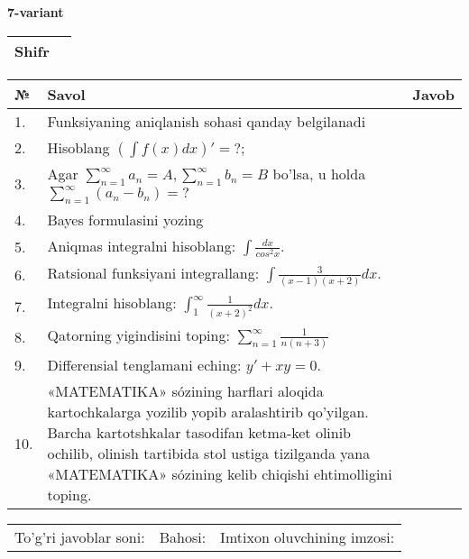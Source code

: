 \documentclass{article}
\begin{document}
  \egroup
  
  \newpage
  
  
  \textbf{7-variant}\\
  
  \bgroup
  \def\arraystretch{1.6} %
  
  \begin{tabular}{|m{5.7cm}|m{9.5cm}|}
  \hline
  Shifr & \\
  \hline
  \end{tabular}
  
  \vspace{1cm}
  
  \begin{tabular}{|m{0.7cm}|m{10cm}|m{4cm}|}
  \hline
  № & Savol & Javob \\
  \hline
  1. & Funksiyaning aniqlanish sohasi qanday belgilanadi &  \\
  \hline
  2. & Hisoblang \(\left( \int {f(x)dx} \right)' = ?\); &  \\
  \hline
  3. & Agar \(\sum_{n = 1}^{\infty}a_{n} = A,\sum_{n = 1}^{\infty}b_{n} = B\) bo'lsa, u holda \(\sum_{n = 1}^{\infty}\left( a_{n} - b_{n} \right) = ?\) &  \\
  \hline
  4. & Bayes formulasini yozing &  \\
  \hline
  5. & Aniqmas integralni hisoblang: \(\int \frac{dx}{cos^{2}x}\). &  \\
  \hline
  6. & Ratsional funksiyani integrallang: \(\int {\frac{3}{(x - 1)(x + 2)}dx}\). &  \\
  \hline
  7. & Integralni hisoblang: \(\int_{1}^{\infty}{\frac{1}{(x + 2)^{2}}dx}\). &  \\
  \hline
  8. & Qatorning yigindisini toping: \(\sum_{n = 1}^{\infty}\frac{1}{n(n + 3)}\) &  \\
  \hline
  9. & Differensial tenglamani eching: \(y' + xy = 0\). &  \\
  \hline
  10. & «MATEMATIKA» sózining harflari aloqida kartochkalarga yozilib yopib aralashtirib qo'yilgan. Barcha kartotshkalar tasodifan ketma-ket olinib ochilib, olinish tartibida stol ustiga tizilganda yana «MATEMATIKA» sózining kelib chiqishi ehtimolligini toping. &  \\
  \hline
  \end{tabular}
  
  \vspace{1cm}
  
  \begin{tabular}{lll}
  To'g'ri javoblar soni: \underline{\hspace{1.5cm}} & 
  Bahosi: \underline{\hspace{1.5cm}} & 
  Imtixon oluvchining imzosi: \underline{\hspace{2cm}} \\
  \end{tabular}
  
\end{document}
